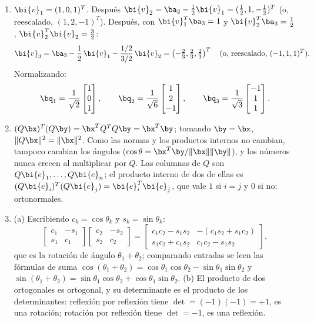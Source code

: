 \begin{enumerate}[leftmargin=*,label=\textbf{\thechapter.\arabic*}]
\item $\bi{v}_1=(1,0,1)^T$. Después
$\bi{v}_2=\ba_2-\frac{1}{2}\bi{v}_1=(\tfrac12,1,-\tfrac12)^T$
(o, reescalado, $(1,2,-1)^T$). Después, con
$\bi{v}_1^T\ba_3=1$ y $\bi{v}_2^T\ba_3=\tfrac12$,
$\bi{v}_2^T\bi{v}_2=\tfrac32$:
\[
\bi{v}_3=\ba_3-\frac12\,\bi{v}_1-\frac{1/2}{3/2}\,\bi{v}_2
=\left(-\tfrac23,\tfrac23,\tfrac23\right)^T
\quad\text{(o, reescalado, }(-1,1,1)^T\text{)}.
\]
Normalizando:
\[
\bq_1=\frac{1}{\sqrt2}\begin{bmatrix}1\\0\\1\end{bmatrix},\qquad
\bq_2=\frac{1}{\sqrt6}\begin{bmatrix}1\\2\\-1\end{bmatrix},\qquad
\bq_3=\frac{1}{\sqrt3}\begin{bmatrix}-1\\1\\1\end{bmatrix}.
\]

\item $(Q\bx)^T(Q\by)=\bx^T Q^T Q\by=\bx^T\by$; tomando
$\by=\bx$, $\|Q\bx\|^2=\|\bx\|^2$. Como las normas y los productos internos
no cambian, tampoco cambian los ángulos
($\cos\theta=\bx^T\by/\|\bx\|\|\by\|$), y los números nunca crecen al
multiplicar por $Q$. Las columnas de $Q$ son $Q\bi{e}_1,\dots,Q\bi{e}_n$; el
producto interno de dos de ellas es
$(Q\bi{e}_i)^T(Q\bi{e}_j)=\bi{e}_i^T\bi{e}_j$, que vale $1$ si
$i=j$ y $0$ si no: ortonormales.

\item (a) Escribiendo $c_k=\cos\theta_k$ y $s_k=\sin\theta_k$:
\[
\begin{bmatrix}c_1&-s_1\\ s_1&c_1\end{bmatrix}
\begin{bmatrix}c_2&-s_2\\ s_2&c_2\end{bmatrix}
=\begin{bmatrix}c_1c_2-s_1s_2&-(c_1s_2+s_1c_2)\\
s_1c_2+c_1s_2&c_1c_2-s_1s_2\end{bmatrix},
\]
que es la rotación de ángulo $\theta_1+\theta_2$; comparando entradas se
leen las fórmulas de suma
$\cos(\theta_1+\theta_2)=\cos\theta_1\cos\theta_2-\sin\theta_1\sin\theta_2$
y
$\sin(\theta_1+\theta_2)=\sin\theta_1\cos\theta_2+\cos\theta_1\sin\theta_2$. (b) El producto de dos ortogonales es ortogonal,
y su determinante es el producto de los determinantes: reflexión por
reflexión tiene $\det=(-1)(-1)=+1$, es una rotación; rotación por reflexión
tiene $\det=-1$, es una reflexión.


\end{enumerate}
